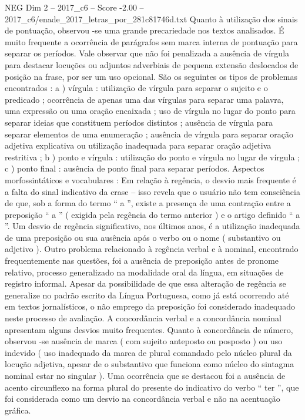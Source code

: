 \begin{textsample}{NEG Dim 2 – 2017\_c6 – Score -2.00 – 2017\_c6/enade\_2017\_letras\_por\_281c81746d.txt}
Quanto à utilização dos sinais de pontuação, observou -se uma grande precariedade nos textos analisados.
É muito frequente a ocorrência de parágrafos sem marca interna de pontuação para separar os períodos.
Vale observar que não foi penalizada a ausência de vírgula para destacar locuções ou adjuntos adverbiais de pequena extensão deslocados de posição na frase, por ser um uso opcional.
São os seguintes os tipos de problemas encontrados : a ) vírgula : utilização de vírgula para separar o sujeito e o predicado ; ocorrência de apenas uma das vírgulas para separar uma palavra, uma expressão ou uma oração encaixada ; uso de vírgula no lugar do ponto para separar ideias que constituem períodos distintos ; ausência de vírgula para separar elementos de uma enumeração ; ausência de vírgula para separar oração adjetiva explicativa ou utilização inadequada para separar oração adjetiva restritiva ; b ) ponto e vírgula : utilização do ponto e vírgula no lugar de vírgula ; c ) ponto final : ausência de ponto final para separar períodos.
Aspectos morfossintáticos e vocabulares : Em relação à regência, o desvio mais frequente é a falta do sinal indicativo da crase – isso revela que o usuário não tem consciência de que, sob a forma do termo “ a ”, existe a presença de uma contração entre a preposição “ a ” ( exigida pela regência do termo anterior ) e o artigo definido “ a ”.
Um desvio de regência significativo, nos últimos anos, é a utilização inadequada de uma preposição ou sua ausência após o verbo ou o nome ( substantivo ou adjetivo ).
Outro problema relacionado à regência verbal e à nominal, encontrado frequentemente nas questões, foi a ausência de preposição antes de pronome relativo, processo generalizado na modalidade oral da língua, em situações de registro informal.
Apesar da possibilidade de que essa alteração de regência se generalize no padrão escrito da Língua Portuguesa, como já está ocorrendo até em textos jornalísticos, o não emprego da preposição foi considerado inadequado neste processo de avaliação.
A concordância verbal e a concordância nominal apresentam alguns desvios muito frequentes.
Quanto à concordância de número, observou -se ausência de marca ( com sujeito anteposto ou posposto ) ou uso indevido ( uso inadequado da marca de plural comandado pelo núcleo plural da locução adjetiva, apesar de o substantivo que funciona como núcleo do sintagma nominal estar no singular ).
Uma ocorrência que se destacou foi a ausência de acento circunflexo na forma plural do presente do indicativo do verbo “ ter ”, que foi considerada como um desvio na concordância verbal e não na acentuação gráfica.

\end{textsample}
